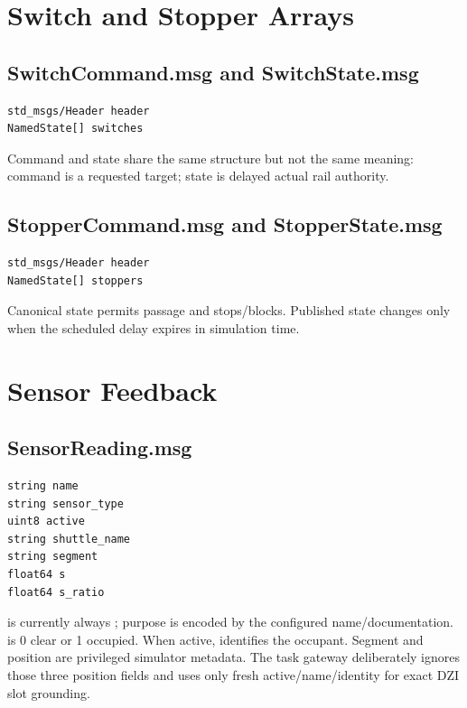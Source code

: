 \section{Switch and Stopper Arrays}

\subsection{SwitchCommand.msg and SwitchState.msg}

\begin{lstlisting}
std_msgs/Header header
NamedState[] switches
\end{lstlisting}

Command and state share the same structure but not the same meaning: command is
a requested target; state is delayed actual rail authority.

\subsection{StopperCommand.msg and StopperState.msg}

\begin{lstlisting}
std_msgs/Header header
NamedState[] stoppers
\end{lstlisting}

Canonical state  permits passage and  stops/blocks. Published
state changes only when the scheduled delay expires in simulation time.

\section{Sensor Feedback}

\subsection{SensorReading.msg}

\begin{lstlisting}
string name
string sensor_type
uint8 active
string shuttle_name
string segment
float64 s
float64 s_ratio
\end{lstlisting}

 is currently always ; purpose is encoded by
the configured name/documentation.  is 0 clear or 1 occupied.
When active,  identifies the occupant. Segment and position
are privileged simulator metadata. The task gateway deliberately ignores those
three position fields and uses only fresh active/name/identity for exact DZI
slot grounding.


